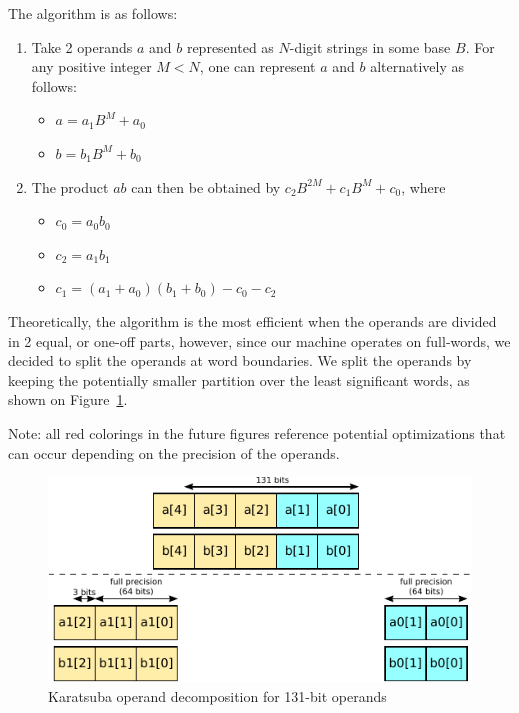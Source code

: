 \documentclass[12pt, a4paper]{report}
\begin{document}
\begin{sloppypar}
The algorithm is as follows:
\begin{enumerate}
\item Take 2 operands $a$ and $b$ represented as $N$-digit strings in some base
$B$.
For any positive integer $M < N$, one can represent $a$ and $b$ alternatively as
follows:
\begin{itemize}
\item $a = a_1 B^M + a_0$
\item $b = b_1 B^M + b_0$
\end{itemize}
\item The product $ab$ can then be obtained by
$c_2 B^{2M} + c_1 B^{M} + c_0$, where
\begin{itemize}
\item $c_0 = a_0 b_0$
\item $c_2 = a_1 b_1$
\item $c_1 = (a_1 + a_0) (b_1 + b_0) - c_0 - c_2$
\end{itemize}
\end{enumerate}

Theoretically, the algorithm is the most efficient when the operands are divided in 2 equal, or one-off
parts, however, since our machine operates on full-words, we decided to split
the operands at word boundaries.
We split the operands by keeping the potentially smaller partition over the least significant words, as shown on
Figure~\ref{fig:karatsuba_operand_cut}.

Note: all red colorings in the future figures reference potential optimizations
that can occur depending on the precision of the operands.

\begin{figure}[h]
\centering
\includegraphics[scale=0.8]{figs/karatsuba_operand_cut}
\caption{Karatsuba operand decomposition for 131-bit operands}
\label{fig:karatsuba_operand_cut}
\end{figure}


\end{sloppypar}
\end{document}
